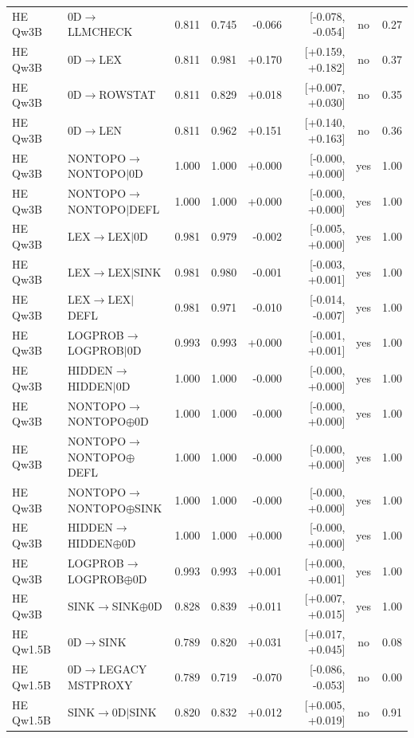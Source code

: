 \begin{longtable}{llrrrrcc}
HE Qw3B & 0D$\to$LLMCHECK & 0.811 & 0.745 & -0.066 & [-0.078, -0.054] & no & 0.27 \\
HE Qw3B & 0D$\to$LEX & 0.811 & 0.981 & +0.170 & [+0.159, +0.182] & no & 0.37 \\
HE Qw3B & 0D$\to$ROWSTAT & 0.811 & 0.829 & +0.018 & [+0.007, +0.030] & no & 0.35 \\
HE Qw3B & 0D$\to$LEN & 0.811 & 0.962 & +0.151 & [+0.140, +0.163] & no & 0.36 \\
HE Qw3B & NONTOPO$\to$NONTOPO$\mid$0D & 1.000 & 1.000 & +0.000 & [-0.000, +0.000] & yes & 1.00 \\
HE Qw3B & NONTOPO$\to$NONTOPO$\mid$DEFL & 1.000 & 1.000 & +0.000 & [-0.000, +0.000] & yes & 1.00 \\
HE Qw3B & LEX$\to$LEX$\mid$0D & 0.981 & 0.979 & -0.002 & [-0.005, +0.000] & yes & 1.00 \\
HE Qw3B & LEX$\to$LEX$\mid$SINK & 0.981 & 0.980 & -0.001 & [-0.003, +0.001] & yes & 1.00 \\
HE Qw3B & LEX$\to$LEX$\mid$DEFL & 0.981 & 0.971 & -0.010 & [-0.014, -0.007] & yes & 1.00 \\
HE Qw3B & LOGPROB$\to$LOGPROB$\mid$0D & 0.993 & 0.993 & +0.000 & [-0.001, +0.001] & yes & 1.00 \\
HE Qw3B & HIDDEN$\to$HIDDEN$\mid$0D & 1.000 & 1.000 & -0.000 & [-0.000, +0.000] & yes & 1.00 \\
HE Qw3B & NONTOPO$\to$NONTOPO$\oplus$0D & 1.000 & 1.000 & -0.000 & [-0.000, +0.000] & yes & 1.00 \\
HE Qw3B & NONTOPO$\to$NONTOPO$\oplus$DEFL & 1.000 & 1.000 & -0.000 & [-0.000, +0.000] & yes & 1.00 \\
HE Qw3B & NONTOPO$\to$NONTOPO$\oplus$SINK & 1.000 & 1.000 & -0.000 & [-0.000, +0.000] & yes & 1.00 \\
HE Qw3B & HIDDEN$\to$HIDDEN$\oplus$0D & 1.000 & 1.000 & +0.000 & [-0.000, +0.000] & yes & 1.00 \\
HE Qw3B & LOGPROB$\to$LOGPROB$\oplus$0D & 0.993 & 0.993 & +0.001 & [+0.000, +0.001] & yes & 1.00 \\
HE Qw3B & SINK$\to$SINK$\oplus$0D & 0.828 & 0.839 & +0.011 & [+0.007, +0.015] & yes & 1.00 \\
HE Qw1.5B & 0D$\to$SINK & 0.789 & 0.820 & +0.031 & [+0.017, +0.045] & no & 0.08 \\
HE Qw1.5B & 0D$\to$LEGACY MSTPROXY & 0.789 & 0.719 & -0.070 & [-0.086, -0.053] & no & 0.00 \\
HE Qw1.5B & SINK$\to$0D$\mid$SINK & 0.820 & 0.832 & +0.012 & [+0.005, +0.019] & no & 0.91 \\

\end{longtable}
